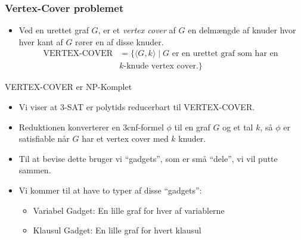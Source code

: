 \begin{frame}[allowframebreaks]
	\frametitle{Vertex-Cover problemet}
	\begin{itemize}
		\item Ved en urettet graf $G$, er et \textit{vertex cover} af $G$ en delmængde af knuder hvor hver kant af $G$ rører en af disse knuder.
		      \begin{align*}
			      \text{VERTEX-COVER} & = \{\langle G , k \rangle \mid G \text{ er en urettet graf som har en } \\
			                          & k\text{-knude vertex cover.}\}
		      \end{align*}
	\end{itemize}
	\begin{theorem}
		VERTEX-COVER er NP-Komplet
	\end{theorem}

	\begin{itemize}
		\item Vi viser at 3-SAT er polytids reducerbart til VERTEX-COVER.
		\item Reduktionen konverterer en 3cnf-formel $\phi$ til en graf $G$ og et tal $k$, så $\phi$ er satisfiable når $G$ har et vertex cover med $k$ knuder.
		\item Til at bevise dette bruger vi ``gadgets'', som er små ``dele'', vi vil putte sammen.
		\item Vi kommer til at have to typer af disse ``gadgets'':
		      \begin{itemize}
			      \item Variabel Gadget: En lille graf for hver af variablerne
			      \item Klausul Gadget: En lille graf for hvert klausul
		      \end{itemize}


\end{itemize}
\end{frame}
